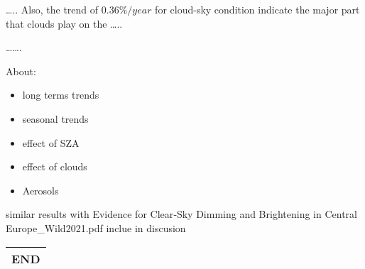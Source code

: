 \documentclass[
  preprint, 3p, authoryear]{article}
\begin{document}
\ldots..
Also, the trend of \(0.36\%/year\) for cloud-sky condition indicate the major part that clouds play on the
\ldots..

\ldots\ldots.

About:

\begin{itemize}
\item
  long terms trends
\item
  seasonal trends
\item
  effect of SZA
\item
  effect of clouds
\item
  Aerosols
\end{itemize}

similar results with Evidence for Clear‐Sky Dimming and Brightening in Central Europe\_Wild2021.pdf
inclue in discusion

\begin{longtable}[]{@{}c@{}}
\toprule
\endhead
\textbf{END} \\
\bottomrule
\end{longtable}
\end{document}
